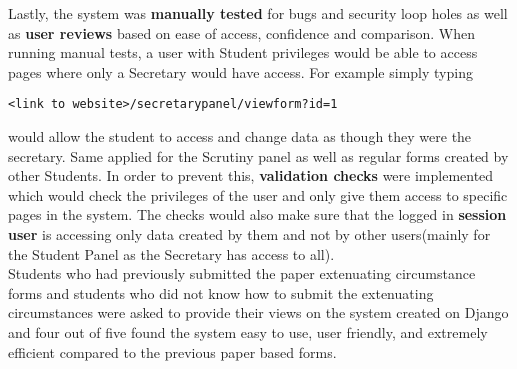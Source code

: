 \documentclass[../main.tex]{subfiles}
\begin{document}
Lastly, the system was \textbf{manually tested} for bugs and security loop holes as well as \textbf{user reviews} based on ease of access, confidence and comparison.
When running manual tests, a user with Student privileges would be able to access pages where only a Secretary would have access. For example simply typing 
\begin{verbatim}
<link to website>/secretarypanel/viewform?id=1
\end{verbatim} 
would allow the student to access and change data as though they were the secretary. Same applied for the Scrutiny panel as well as regular forms created by other Students. In order to prevent this, \textbf{validation checks} were implemented which would check the privileges of the user and only give them access to specific pages in the system. The checks would also make sure that the logged in \textbf{session user} is accessing only data created by them and not by other users(mainly for the Student Panel as the Secretary has access to all). \\
Students who had previously submitted the paper extenuating circumstance forms and students who did not know how to submit the extenuating circumstances were asked to provide their views on the system created on Django and four out of five found the system easy to use, user friendly, and extremely efficient compared to the previous paper based forms. 
\end{document}
